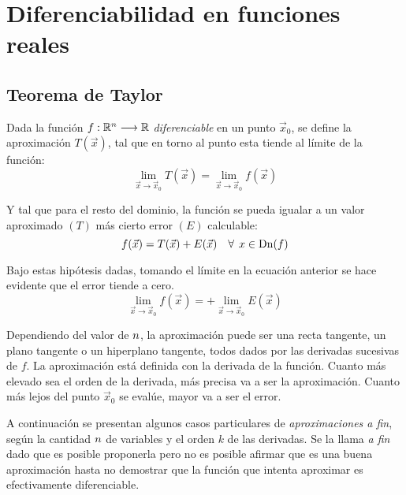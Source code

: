 \chapter{Diferenciabilidad en funciones reales}

\section{Teorema de Taylor}

Dada la función $f:\mathbb{R}^n \longrightarrow \mathbb{R}$ \emph{diferenciable} en un punto $\Vec{x}_0$, se define la aproximación $T(\Vec{x})$, tal que en torno al punto esta tiende al límite de la función:
\begin{equation*}
    \lim_{\Vec{x} \to \Vec{x}_0} T(\Vec{x}) = \lim_{\Vec{x} \to \Vec{x}_0} f(\Vec{x})
\end{equation*}

Y tal que para el resto del dominio, la función se pueda igualar a un valor aproximado $(T)$ más cierto error $(E)$ calculable:
\begin{equation*}
    f(\Vec{x}) = T(\Vec{x}) + E(\Vec{x}) \quad \forall \hspace{1ex} x \in \operatorname{Dn}(f)
\end{equation*}

Bajo estas hipótesis dadas, tomando el límite en la ecuación anterior se hace evidente que el error tiende a cero.
\begin{equation*}
    \lim_{\Vec{x} \to \Vec{x}_0} f(\Vec{x})
    = 
    + \lim_{\Vec{x} \to \Vec{x}_0} E(\Vec{x})
\end{equation*}

Dependiendo del valor de $n$, la aproximación puede ser una recta tangente, un plano tangente o un hiperplano tangente, todos dados por las derivadas sucesivas de $f$.
La aproximación está definida con la derivada de la función.
Cuanto más elevado sea el orden de la derivada, más precisa va a ser la aproximación.
Cuanto más lejos del punto $\Vec{x}_0$ se evalúe, mayor va a ser el error.

A continuación se presentan algunos casos particulares de \emph{aproximaciones a fin}, según la cantidad $n$ de variables y el orden $k$ de las derivadas.
Se la llama \emph{a fin} dado que es posible proponerla pero no es posible afirmar que es una buena aproximación hasta no demostrar que la función que intenta aproximar es efectivamente diferenciable.


